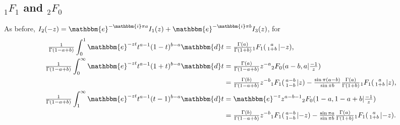 \documentclass[12pt]{article}
\newcommand{\ee}[0] {\mathbbm{e}}
\newcommand{\ii}[0] {\mathbbm{i}}
\newcommand{\dd}[0] {\mathbbm{d}}
\numberwithin{equation}{section}
\newcommand{\FFs}[6] {{}_{#1}{#2}_{#3} ( \begin{smallmatrix} #4 \\ #5 \end{smallmatrix} | {#6}  )}
\begin{document}
\subsection{${}_1 F_1$ and ${}_2 F_0$}
As before, $I_2(-z) = \ee^{-\ii \pi a } I_1(z) + \ee^{-\ii \pi b} I_3(z)$, for
\newcommand{\soltwo}[1] {\tfrac{\Gamma(b)}{ \Gamma(1-a+b)} z^{-b} \FFs{1}{F}{1}{a-b}{1-b}{#1}}
\newcommand{\solzero}[1] {\tfrac{\Gamma(a)}{ \Gamma(1+b)} \FFs{1}{F}{1}{a}{1+b}{#1}}
\begin{align*}
\tfrac{1}{\Gamma(1-a+b)} \int_0^1 \ee^{-z t} t^{a-1} (1-t)^{b-a} \dd t &= \solzero{-z}\text{,}\\
\tfrac{1}{\Gamma(1-a+b)} \int_0^{\infty} \ee^{-z t} t^{a-1} (1+t)^{b-a} \dd t &= \tfrac{\Gamma(a)}{\Gamma(1-a+b)} z^{-a} {}_2 F_0(a-b,a|\tfrac{-1}{z})\\
 &= \soltwo{z} - \tfrac{\sin \pi (a-b)}{\sin \pi b} \solzero{z}\text{,}\\
\tfrac{1}{\Gamma(1-a+b)} \int_1^{\infty} \ee^{-z t} t^{a-1} (t-1)^{b-a} \dd t &= \ee^{-z} z^{a-b-1} {}_2 F_0(1-a,1-a+b|\tfrac{-1}{z})\\ 
&= \soltwo{-z} - \tfrac{\sin \pi a}{\sin \pi b} \solzero{-z}\text{.}
\end{align*}
\let\soltwo\undefined
\let\solzero\undefined
\end{document}
